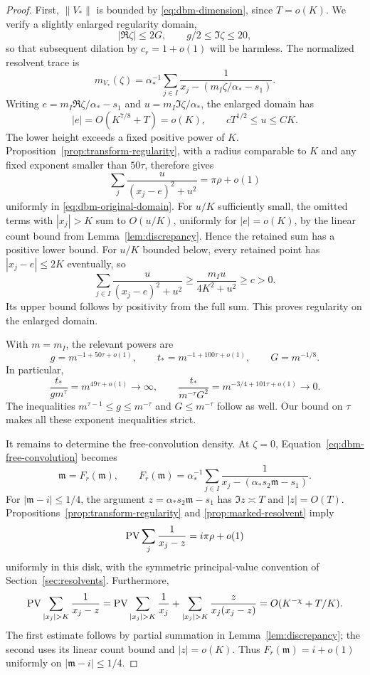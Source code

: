 \begin{proof}
First, \(\|V_*\|\) is bounded by
\eqref{eq:dbm-dimension}, since \(T=o(K)\).
We verify a slightly enlarged regularity domain,
\[
 |\Re\zeta|\le2G,\qquad g/2\le\Im\zeta\le20,
\]
so that subsequent dilation by \(c_r=1+o(1)\) will be harmless.
The normalized resolvent trace is
\[
 m_{V_*}(\zeta)=
   \alpha_*^{-1}\sum_{j\in I}
        \frac1{x_j-(m_I\zeta/\alpha_*-s_1)}.
\]
Writing \(e=m_I\Re\zeta/\alpha_*-s_1\) and
\(u=m_I\Im\zeta/\alpha_*\), the enlarged domain has
\begin{equation}
 \label{eq:dbm-original-domain}
 |e|=O(K^{7/8}+T)=o(K),\qquad
 cT^{1/2}\le u\le CK.
\end{equation}
The lower height exceeds a fixed positive power of \(K\).
Proposition~\ref{prop:transform-regularity}, with a radius comparable to \(K\)
and any fixed exponent smaller than \(50\tau\), therefore gives
\[
 \sum_j\frac{u}{(x_j-e)^2+u^2}
       =\pi\rho+o(1)
\]
uniformly in \eqref{eq:dbm-original-domain}.
For \(u/K\) sufficiently small, the omitted terms with \(|x_j|>K\)
sum to \(O(u/K)\), uniformly for \(|e|=o(K)\), by the linear count
bound from Lemma~\ref{lem:discrepancy}. Hence the retained sum
has a positive lower bound. For \(u/K\) bounded below, every retained
point has \(|x_j-e|\le2K\) eventually, so
\[
 \sum_{j\in I}\frac{u}{(x_j-e)^2+u^2}
   \ge \frac{m_Iu}{4K^2+u^2}\ge c>0.
\]
Its upper bound follows by positivity from the full sum.
This proves regularity on the enlarged domain.

With \(m=m_I\), the relevant powers are
\[
 g=m^{-1+50\tau+o(1)},\qquad
 t_*=m^{-1+100\tau+o(1)},\qquad G=m^{-1/8}.
\]
In particular,
\[
 \frac{t_*}{g m^\tau}=m^{49\tau+o(1)}\longrightarrow\infty,
 \qquad
 \frac{t_*}{m^{-\tau}G^2}
     =m^{-3/4+101\tau+o(1)}\longrightarrow0.
\]
The inequalities \(m^{\tau-1}\le g\le m^{-\tau}\) and
\(G\le m^{-\tau}\) follow as well. Our bound on \(\tau\) makes all
these exponent inequalities strict.

It remains to determine the free-convolution density. At \(\zeta=0\),
Equation~\eqref{eq:dbm-free-convolution} becomes
\begin{equation}
 \label{eq:dbm-boundary-equation}
 \mathfrak m=F_r(\mathfrak m),\qquad
 F_r(\mathfrak m)=\alpha_*^{-1}\sum_{j\in I}
     \frac1{x_j-(\alpha_*s_2\mathfrak m-s_1)}.
\end{equation}
For \(|\mathfrak m-i|\le1/4\), the argument
\(z=\alpha_*s_2\mathfrak m-s_1\) has \(\Im z\asymp T\) and \(|z|=O(T)\).
Propositions~\ref{prop:transform-regularity} and
\ref{prop:marked-resolvent} imply
\[
 \operatorname{PV}\sum_j\frac1{x_j-z}=i\pi\rho+o(1)
\]
uniformly in this disk, with the symmetric principal-value convention
of Section~\ref{sec:resolvents}. Furthermore,
\[
 \PV\sum_{|x_j|>K}\frac1{x_j-z}
   =\PV\sum_{|x_j|>K}\frac1{x_j}
      +\sum_{|x_j|>K}\frac{z}{x_j(x_j-z)}
   =O(K^{-\chi}+T/K).
\]
The first estimate follows by partial summation in
Lemma~\ref{lem:discrepancy}; the second uses its linear count bound and
\(|z|=o(K)\). Thus \(F_r(\mathfrak m)=i+o(1)\) uniformly on
\(|\mathfrak m-i|\le1/4\).


\end{proof}
